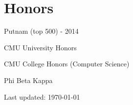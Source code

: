 \documentclass[letterpaper]{article}
\renewenvironment{itemize}{
  \begin{list}{}{
    \setlength{\leftmargin}{1.5em}
  }
}{
  \end{list}
}
\begin{document}



\section*{Honors}

\begin{itemize}
\item Putnam (top 500) - 2014
\item CMU University Honors
\item CMU College Honors (Computer Science)
\item Phi Beta Kappa
\end{itemize}

\bigskip

\begin{center}
  \begin{footnotesize}
    Last updated: \today
  \end{footnotesize}
\end{center}
\end{document}
